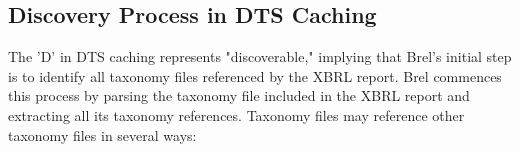 

\subsection{Discovery Process in DTS Caching}

The 'D' in DTS caching represents "discoverable," implying that Brel's initial step is to identify all taxonomy files referenced by the XBRL report. 
Brel commences this process by parsing the taxonomy file included in the XBRL report and extracting all its taxonomy references. 
Taxonomy files may reference other taxonomy files in several ways:

